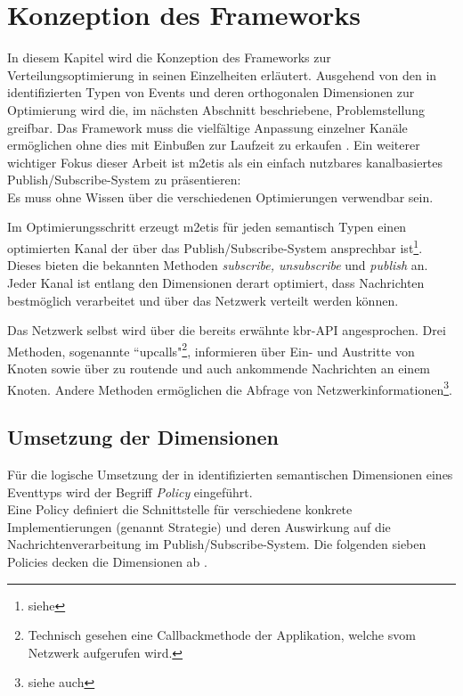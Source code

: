 \chapter{Konzeption des Frameworks}
\label{chap:konzeption_pubsub}
In diesem Kapitel wird die Konzeption des Frameworks zur Verteilungsoptimierung in seinen Einzelheiten erläutert. Ausgehend von den in \cite{Fischer2010a} identifizierten Typen von Events und deren orthogonalen Dimensionen zur Optimierung wird die, im nächsten Abschnitt beschriebene, Problemstellung greifbar. Das Framework muss die vielfältige Anpassung einzelner Kanäle ermöglichen ohne dies mit Einbußen zur Laufzeit zu erkaufen \cite{NEW_PAPER} . Ein weiterer wichtiger Fokus dieser Arbeit ist \ac{m2etis} als ein einfach nutzbares kanalbasiertes Publish/Subscribe-System zu präsentieren:\\
Es muss ohne Wissen über die verschiedenen Optimierungen verwendbar sein.

Im Optimierungsschritt erzeugt \ac{m2etis} für jeden semantisch Typen einen optimierten Kanal der über das Publish/Subscribe-System ansprechbar ist\footnote{siehe }. Dieses bieten die bekannten Methoden \emph{subscribe, unsubscribe} und \emph{publish} an. Jeder Kanal ist entlang den Dimensionen derart optimiert, dass Nachrichten bestmöglich verarbeitet und über das Netzwerk verteilt werden können.

Das Netzwerk selbst wird über die bereits erwähnte \ac{kbr}-API angesprochen. Drei Methoden, sogenannte ``upcalls"\footnote{Technisch gesehen eine Callbackmethode der Applikation, welche svom Netzwerk aufgerufen wird.},  informieren über Ein- und Austritte von Knoten sowie über zu routende und auch ankommende Nachrichten an einem Knoten. Andere Methoden ermöglichen die Abfrage von Netzwerkinformationen\footnote{siehe auch }.

\section{Umsetzung der Dimensionen}
Für die logische Umsetzung der in \cite{Fischer2010Event} identifizierten semantischen Dimensionen eines Eventtyps wird der Begriff \emph{Policy} eingeführt.\\
Eine Policy definiert die Schnittstelle für verschiedene konkrete Implementierungen (genannt Strategie) und deren Auswirkung auf die Nachrichtenverarbeitung im Publish/Subscribe-System. Die folgenden sieben Policies decken die Dimensionen ab \cite{NEW_PAPER}.


